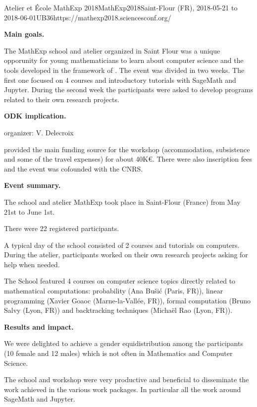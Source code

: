 \begin{event}{Atelier et \'Ecole MathExp 2018}{MathExp2018}{Saint-Flour (FR),
2018-05-21 to 2018-06-01}{UB}{36}{https://mathexp2018.sciencesconf.org/}

\textbf{Main goals.}

The MathExp school and atelier organized in Saint Flour was a unique
opporunity for young mathematicians to learn about computer science
and the tools developed in the framework of \ODK. The event
was divided in two weeks. The first one focused on 4 courses and
introductory tutorials with SageMath and Jupyter. During the second
week the participants were asked to develop programs related to their
own research projects.

\textbf{ODK implication.} 

\ODK organizer: V. Delecroix

\ODK provided the main funding source for the workshop (accommodation,
subsistence and some of the travel expenses) for about 40K€. There were
also inscription fees and the event was cofounded with the CNRS.

\textbf{Event summary.} 

The school and atelier MathExp took place in Saint-Flour (France)
from May 21st to June 1st.

There were 22 registered participants.

A typical day of the school consisted of 2 courses and tutorials
on computers. During the atelier, participants worked on their
own research projects asking for help when needed.

The School featured 4 courses on computer science topics directly
related to mathematical computations: probability (Ana Bušić (Paris, FR)),
linear programming (Xavier Goaoc (Marne-la-Vallée, FR)), formal computation
(Bruno Salvy (Lyon, FR)) and backtracking techniques (Michaël Rao (Lyon, FR)).

\textbf{Results and impact.} 

We were delighted to achieve a gender equidistribution among the participants
(10 female and 12 males) which is not often in Mathematics and Computer
Science.

The school and workshop were very productive and beneficial to disseminate
the work achieved in the various work packages. In particular
all the work around SageMath and Jupyter.

\end{event}
